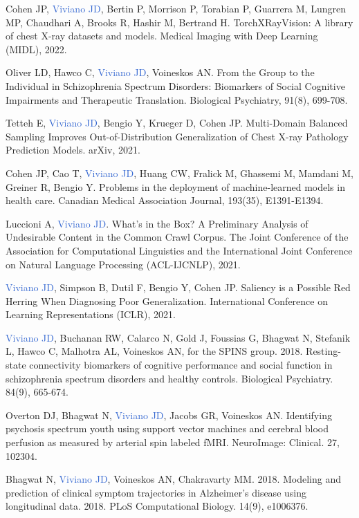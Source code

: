 \documentclass[a4paper,11pt,oneside]{book}
\newcommand\paper[1]{
    #1\\
    \vspace{3.5mm}
}
\begin{document}
\begin{flushleft}
\paper{Cohen JP, \textcolor{highlight}{Viviano JD}, Bertin P, Morrison P, Torabian P, Guarrera M, Lungren MP, Chaudhari A, Brooks R, Hashir M, Bertrand H. TorchXRayVision: A library of chest X-ray datasets and models. Medical Imaging with Deep Learning (MIDL), 2022.}

\paper{Oliver LD, Hawco C, \textcolor{highlight}{Viviano JD}, Voineskos AN. From the Group to the Individual in Schizophrenia Spectrum Disorders: Biomarkers of Social Cognitive Impairments and Therapeutic Translation. Biological Psychiatry, 91(8), 699-708.}

\paper{Tetteh E, \textcolor{highlight}{Viviano JD}, Bengio Y, Krueger D, Cohen JP. Multi-Domain Balanced Sampling Improves Out-of-Distribution Generalization of Chest X-ray Pathology Prediction Models. arXiv, 2021.}

\paper{Cohen JP, Cao T, \textcolor{highlight}{Viviano JD}, Huang CW, Fralick M, Ghassemi M, Mamdani M, Greiner R, Bengio Y. Problems in the deployment of machine-learned models in health care. Canadian Medical Association Journal, 193(35), E1391-E1394.}

\paper{Luccioni A, \textcolor{highlight}{Viviano JD}. What’s in the Box? A Preliminary Analysis of Undesirable Content in the Common Crawl Corpus. The Joint Conference of the Association for Computational Linguistics and the International Joint Conference on Natural Language Processing (ACL-IJCNLP), 2021.}

\paper{\textcolor{highlight}{Viviano JD}, Simpson B, Dutil F, Bengio Y, Cohen JP. Saliency is a Possible Red Herring When Diagnosing Poor Generalization. International Conference on Learning Representations (ICLR), 2021.}

\paper{\textcolor{highlight}{Viviano JD}, Buchanan RW, Calarco N, Gold J, Foussias G, Bhagwat N, Stefanik L, Hawco C, Malhotra AL, Voineskos AN, for the SPINS group. 2018. Resting-state connectivity biomarkers of cognitive performance and social function in schizophrenia spectrum disorders and healthy controls. Biological Psychiatry. 84(9), 665-674.}

\paper{Overton DJ, Bhagwat N, \textcolor{highlight}{Viviano JD}, Jacobs GR, Voineskos AN. Identifying psychosis spectrum youth using support vector machines and cerebral blood perfusion as measured by arterial spin labeled fMRI. NeuroImage: Clinical. 27, 102304.}

\paper{Bhagwat N, \textcolor{highlight}{Viviano JD}, Voineskos AN, Chakravarty MM. 2018. Modeling and prediction of clinical symptom trajectories in Alzheimer's disease using longitudinal data. 2018. PLoS Computational Biology. 14(9), e1006376.}


\end{flushleft}
\end{document}
